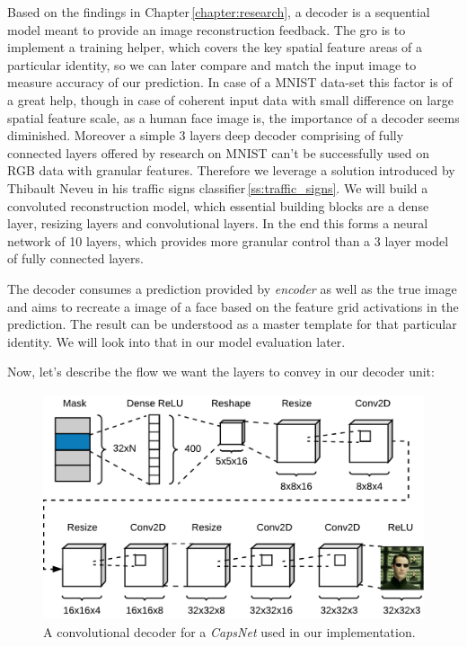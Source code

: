 Based on the findings in Chapter\,\ref{chapter:research}, a decoder is a sequential model meant to provide an image reconstruction feedback. The gro is to implement a training helper, which covers the key spatial feature areas of a particular identity, so we can later compare and match the input image to measure accuracy of our prediction. In case of a MNIST data-set this factor is of a great help, though in case of coherent input data with small difference on large spatial feature scale, as a human face image is, the importance of a decoder seems diminished. Moreover a simple 3 layers deep decoder comprising of fully connected layers offered by research on MNIST can't be successfully used on RGB data with granular features. Therefore we leverage a solution introduced by Thibault Neveu in his traffic signs classifier\,\ref{ss:traffic_signs}. We will build a convoluted reconstruction model, which essential building blocks are a dense layer, resizing layers and convolutional layers. In the end this forms a neural network of 10 layers, which provides more granular control than a 3 layer model of fully connected layers.

The decoder consumes a prediction provided by \textit{encoder} as well as the true image and aims to recreate a image of a face based on the feature grid activations in the prediction. The result can be understood as a master template for that particular identity. We will look into that in our model evaluation later.

Now, let's describe the flow we want the layers to convey in our decoder unit:

\begin{figure}[ht]
    \centering
    \includegraphics[height=18em]{obrazky-figures/my_decoder.pdf}
    \caption{A convolutional decoder for a \textit{CapsNet} used in our implementation.}
    \label{fig:my_decoder}
\end{figure}

